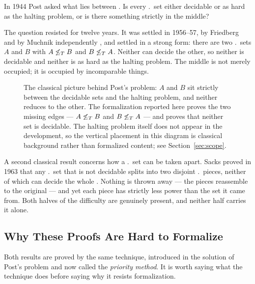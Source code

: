 In 1944 Post asked what lies between \cite{post1944}.  Is every \ce.\ set
either decidable or as hard as the halting problem, or is there something
strictly in the middle?

The question resisted for twelve years.  It was settled in 1956--57, by
Friedberg and by Muchnik independently \cite{friedberg1957,muchnik1956},
and settled in a strong form: there are two \ce.\ sets $A$ and $B$ with
$A \not\leq_T B$ and $B \not\leq_T A$.  Neither can decide the other, so
neither is decidable and neither is as hard as the halting problem.  The
middle is not merely occupied; it is occupied by incomparable things.

\begin{figure}[h]
\centering
{}
\caption{The classical picture behind Post's problem: $A$ and $B$ sit
strictly between the decidable sets and the halting problem, and neither
reduces to the other.  The formalization reported here proves the two
missing edges --- $A\not\leq_T B$ and $B\not\leq_T A$ --- and proves that
neither set is decidable.  The halting problem itself does not appear in
the development, so the vertical placement in this diagram is classical
background rather than formalized content; see
Section~\ref{sec:scope}.}
\label{fig:degrees}
\end{figure}

A second classical result concerns how a \ce.\ set can be taken apart.
Sacks proved in 1963 that any \ce.\ set that is not decidable splits into
two disjoint \ce.\ pieces, neither of which can decide the whole
\cite{sacks1963}.  Nothing is thrown away --- the pieces reassemble to the
original --- and yet each piece has strictly less power than the set it
came from.  Both halves of the difficulty are genuinely present, and
neither half carries it alone.

\subsection{Why These Proofs Are Hard to Formalize}

Both results are proved by the same technique, introduced in the solution
of Post's problem and now called the \emph{priority method}.  It is worth
saying what the technique does before saying why it resists formalization.

